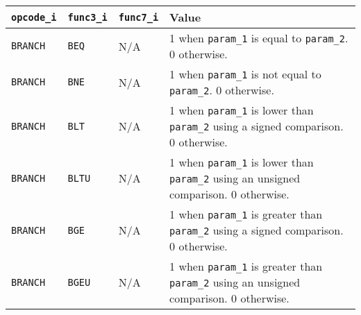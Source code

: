 {
\footnotesize
\begin{tabularx}{0.9\textwidth}{|l|l|l|X|}
  \hline
  \cellcolor{gray!20}\textbf{\texttt{opcode\_i}} & \cellcolor{gray!20}\textbf{\texttt{func3\_i}} & \cellcolor{gray!20}\textbf{\texttt{func7\_i}} & \cellcolor{gray!20}\textbf{Value} \\
  \hline
  \texttt{BRANCH} & \texttt{BEQ} & N/A & 1 when \texttt{param\_1} is equal to \texttt{param\_2}. 0 otherwise. \\
  \hline
  \texttt{BRANCH} & \texttt{BNE} & N/A & 1 when \texttt{param\_1} is not equal to \texttt{param\_2}. 0 otherwise. \\
  \hline
  \texttt{BRANCH} & \texttt{BLT} & N/A & 1 when \texttt{param\_1} is lower than \texttt{param\_2} using a signed comparison. 0 otherwise. \\
  \hline
  \texttt{BRANCH} & \texttt{BLTU} & N/A & 1 when \texttt{param\_1} is lower than \texttt{param\_2} using an unsigned comparison. 0 otherwise. \\
  \hline
  \texttt{BRANCH} & \texttt{BGE} & N/A & 1 when \texttt{param\_1} is greater than \texttt{param\_2} using a signed comparison. 0 otherwise. \\
  \hline
  \texttt{BRANCH} & \texttt{BGEU} & N/A & 1 when \texttt{param\_1} is greater than \texttt{param\_2} using an unsigned comparison. 0 otherwise. \\
  \hline
\end{tabularx}
}
